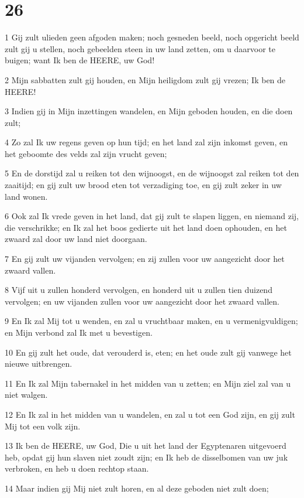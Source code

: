 \chapter{26}

\par 1 Gij zult ulieden geen afgoden maken; noch gesneden beeld, noch opgericht beeld zult gij u stellen, noch gebeelden steen in uw land zetten, om u daarvoor te buigen; want Ik ben de HEERE, uw God!
\par 2 Mijn sabbatten zult gij houden, en Mijn heiligdom zult gij vrezen; Ik ben de HEERE!
\par 3 Indien gij in Mijn inzettingen wandelen, en Mijn geboden houden, en die doen zult;
\par 4 Zo zal Ik uw regens geven op hun tijd; en het land zal zijn inkomst geven, en het geboomte des velds zal zijn vrucht geven;
\par 5 En de dorstijd zal u reiken tot den wijnoogst, en de wijnoogst zal reiken tot den zaaitijd; en gij zult uw brood eten tot verzadiging toe, en gij zult zeker in uw land wonen.
\par 6 Ook zal Ik vrede geven in het land, dat gij zult te slapen liggen, en niemand zij, die verschrikke; en Ik zal het boos gedierte uit het land doen ophouden, en het zwaard zal door uw land niet doorgaan.
\par 7 En gij zult uw vijanden vervolgen; en zij zullen voor uw aangezicht door het zwaard vallen.
\par 8 Vijf uit u zullen honderd vervolgen, en honderd uit u zullen tien duizend vervolgen; en uw vijanden zullen voor uw aangezicht door het zwaard vallen.
\par 9 En Ik zal Mij tot u wenden, en zal u vruchtbaar maken, en u vermenigvuldigen; en Mijn verbond zal Ik met u bevestigen.
\par 10 En gij zult het oude, dat verouderd is, eten; en het oude zult gij vanwege het nieuwe uitbrengen.
\par 11 En Ik zal Mijn tabernakel in het midden van u zetten; en Mijn ziel zal van u niet walgen.
\par 12 En Ik zal in het midden van u wandelen, en zal u tot een God zijn, en gij zult Mij tot een volk zijn.
\par 13 Ik ben de HEERE, uw God, Die u uit het land der Egyptenaren uitgevoerd heb, opdat gij hun slaven niet zoudt zijn; en Ik heb de disselbomen van uw juk verbroken, en heb u doen rechtop staan.
\par 14 Maar indien gij Mij niet zult horen, en al deze geboden niet zult doen;
